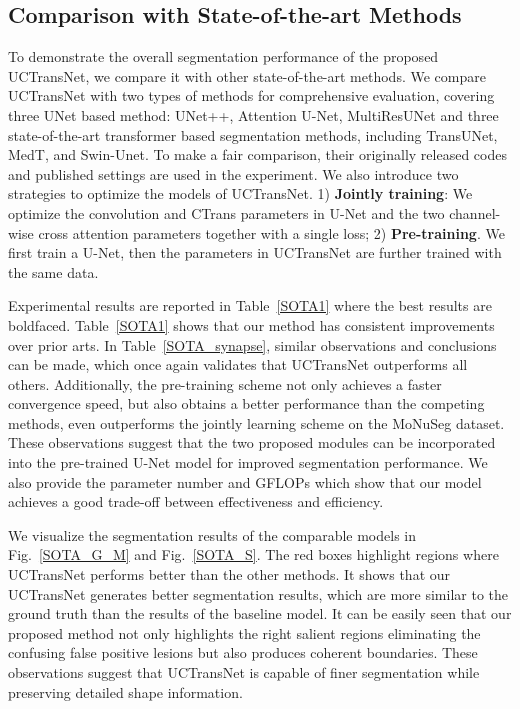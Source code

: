 \documentclass[letterpaper]{article} \usepackage{aaai22}  \usepackage{times}  \usepackage{helvet}  \usepackage{courier}  \usepackage[hyphens]{url}  \usepackage{graphicx} \urlstyle{rm} \def\UrlFont{\rm}  \usepackage{natbib}  \usepackage{caption} \DeclareCaptionStyle{ruled}{labelfont=normalfont,labelsep=colon,strut=off} \frenchspacing  \setlength{\pdfpagewidth}{8.5in}  \setlength{\pdfpageheight}{11in}  \usepackage{algorithm}
\begin{document}
	\subsection{Comparison with State-of-the-art Methods}
	To demonstrate the overall segmentation performance of the proposed UCTransNet, we compare it with other state-of-the-art methods.
	We compare UCTransNet with two types of methods for comprehensive evaluation, covering three UNet based method: UNet++, Attention U-Net, MultiResUNet and three state-of-the-art transformer based segmentation methods, including TransUNet, MedT, and Swin-Unet. 
	To make a fair comparison, their originally released codes and published settings are used in the experiment.
	We also introduce two strategies to optimize the models of UCTransNet.
	1) \textbf{Jointly training}: We optimize the convolution and CTrans parameters in U-Net and the two channel-wise cross attention parameters  together with a single loss;  2) \textbf{Pre-training}. We first train a U-Net, then the parameters in UCTransNet are further trained with the same data.
	
	
	Experimental results are reported in Table~\ref{SOTA1} where the best results are boldfaced.
	Table~\ref{SOTA1} shows that our method has consistent improvements over prior arts.
	In Table~\ref{SOTA_synapse}, similar observations and conclusions can be made, which once again validates that UCTransNet outperforms all others. Additionally, the pre-training scheme not only achieves a faster convergence speed, but also obtains a better performance than the competing methods, even outperforms the jointly learning scheme on the MoNuSeg dataset. These observations suggest that the two proposed modules can be incorporated into the pre-trained U-Net model for improved segmentation performance.
	We also provide the parameter number and GFLOPs which show that our model achieves a good trade-off between effectiveness and efficiency.
	
	We visualize the segmentation results of the comparable models in Fig.~\ref{SOTA_G_M} and Fig.~\ref{SOTA_S}.
	The red boxes highlight regions where UCTransNet performs better than the other methods. It shows that our UCTransNet generates better segmentation results, which are more similar to the ground truth than the results of the baseline model. It can be easily seen that our proposed method not only highlights the right salient regions eliminating the confusing false positive lesions but also produces coherent boundaries. 
	These observations suggest that UCTransNet is capable of finer segmentation while preserving detailed shape information.
	
\end{document}
